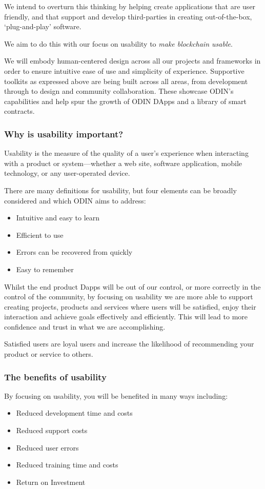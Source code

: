 We intend to overturn this thinking by helping create applications that are user friendly, and that support and develop third-parties in creating out-of-the-box, `plug-and-play' software.

We aim to do this with our focus on usability to \textit{make blockchain usable}.

We will embody human-centered design across all our projects and frameworks in order to ensure intuitive ease of use and simplicity of experience. Supportive toolkits as expressed above are being built across all areas, from development through to design and community collaboration. These showcase ODIN's capabilities and help spur the growth of ODIN DApps and a library of smart contracts.

\subsubsection{Why is usability important?}
Usability is the measure of the quality of a user's experience when interacting with a product or system---whether a web site, software application, mobile technology, or any user-operated device.

There are many definitions for usability, but four elements can be broadly considered and which ODIN aims to address:
\begin{itemize}
   \item Intuitive and easy to learn
   \item Efficient to use
   \item Errors can be recovered from quickly
   \item Easy to remember
\end{itemize}
    
Whilst the end product Dapps will be out of our control, or more correctly in the control of the community, by focusing on usability we are more able to support creating projects, products and services where users will be satisfied, enjoy their interaction and achieve goals effectively and efficiently.  This will lead to more confidence and trust in what we are accomplishing.

Satisfied users are loyal users and increase the likelihood of recommending your product or service to others.

\subsubsection{The benefits of usability}
By focusing on usability, you will be benefited in many ways including:
\begin{itemize}
   \item Reduced development time and costs
   \item Reduced support costs
   \item Reduced user errors
   \item Reduced training time and costs
   \item Return on Investment
\end{itemize}

